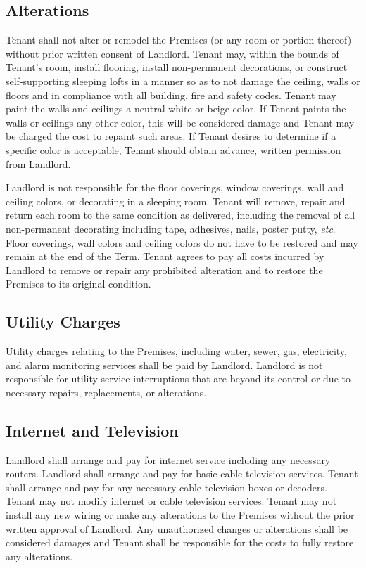 \documentclass{article}
\begin{document}
\subsection{Alterations}
Tenant shall not alter or remodel the Premises (or any room or portion thereof)
without prior written consent of Landlord. Tenant may, within the bounds of
Tenant’s room, install flooring, install non-permanent decorations, or construct
self-supporting sleeping lofts in a manner so as to not damage the ceiling,
walls or floors and in compliance with all building, fire and safety codes.
Tenant may paint the walls and ceilings a neutral white or beige color. If
Tenant paints the walls or ceilings any other color, this will be considered
damage and Tenant may be charged the cost to repaint such areas. If Tenant
desires to determine if a specific color is acceptable, Tenant should obtain
advance, written permission from Landlord.

Landlord is not responsible for the floor coverings, window coverings, wall and
ceiling colors, or decorating in a sleeping room. Tenant will remove, repair and
return each room to the same condition as delivered, including the removal of
all non-permanent decorating including tape, adhesives, nails, poster putty,
\textit{etc}. Floor coverings, wall colors and ceiling colors do not have to be
restored and may remain at the end of the Term. Tenant agrees to pay all costs
incurred by Landlord to remove or repair any prohibited alteration and to
restore the Premises to its original condition.

\subsection{Utility Charges}
Utility charges relating to the Premises, including water, sewer, gas,
electricity, and alarm monitoring services shall be paid by Landlord. Landlord
is not responsible for utility service interruptions that are beyond its control
or due to necessary repairs, replacements, or alterations.

\subsection{Internet and Television}
Landlord shall arrange and pay for internet service including any necessary
routers. Landlord shall arrange and pay for basic cable television services.
Tenant shall arrange and pay for any necessary cable television boxes or
decoders. Tenant may not modify internet or cable television services. Tenant
may not install any new wiring or make any alterations to the Premises without
the prior written approval of Landlord. Any unauthorized changes or alterations
shall be considered damages and Tenant shall be responsible for the costs to
fully restore any alterations.
\end{document}
